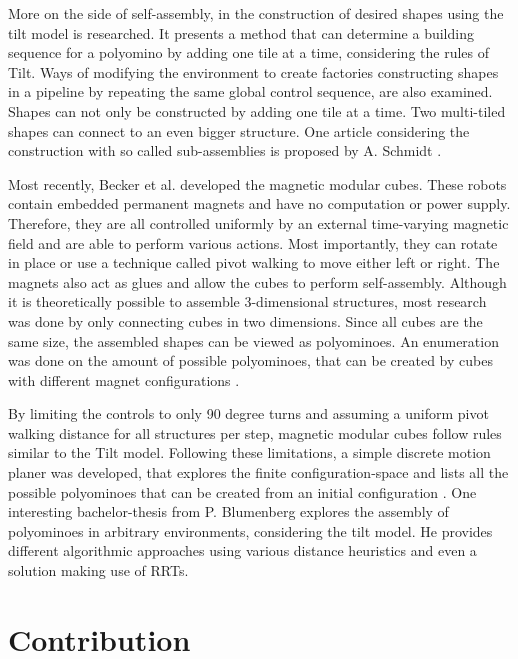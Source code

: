 More on the side of self-assembly, in \cite{Fekete2020} the construction of desired shapes using the tilt model is researched.
It presents a method that can determine a building sequence for a polyomino by adding one tile at a time, considering the rules of Tilt.
Ways of modifying the environment to create factories constructing shapes in a pipeline by repeating the same global control sequence, are also examined.
Shapes can not only be constructed by adding one tile at a time.
Two multi-tiled shapes can connect to an even bigger structure.
One article considering the construction with so called sub-assemblies is proposed by A. Schmidt \cite{Schmidt2018}.

Most recently, Becker et al. \cite{Becker2022} developed the magnetic modular cubes.
These robots contain embedded permanent magnets and have no computation or power supply.
Therefore, they are all controlled uniformly by an external time-varying magnetic field and are able to perform various actions.
Most importantly, they can rotate in place or use a technique called pivot walking to move either left or right.
The magnets also act as glues and allow the cubes to perform self-assembly.
Although it is theoretically possible to assemble 3-dimensional structures, most research was done by only connecting cubes in two dimensions.
Since all cubes are the same size, the assembled shapes can be viewed as polyominoes.
An enumeration was done on the amount of possible polyominoes, that can be created by cubes with different magnet configurations \cite{Becker2021}.

By limiting the controls to only 90 degree turns and assuming a uniform pivot walking distance for all structures per step, magnetic modular cubes follow rules similar to the Tilt model.
Following these limitations, a simple discrete motion planer was developed, that explores the finite configuration-space and lists all the possible polyominoes that can be created from an initial configuration \cite{Becker2022}.
One interesting bachelor-thesis from P. Blumenberg \cite{Blumenberg2022} explores the assembly of polyominoes in arbitrary environments, considering the tilt model.
He provides different algorithmic approaches using various distance heuristics and even a solution making use of RRTs. 

  

\begin{comment}
Different methods for motion planning:

simple discrete planning

sample-based planning

Tilt assembly 

- global control ...
- Applications	
- reconfiguration problem PSPACE Complete

Construction of shapes

- what can be done with complex enviroment
- on tile at a time
- sub-assemblies

Magnetic cubes

- explain cubes with magnets, pivotwalking
- discrete planner
- enumeration of polyominoes, consider fixed polys
\end{comment}



\section{Contribution}
